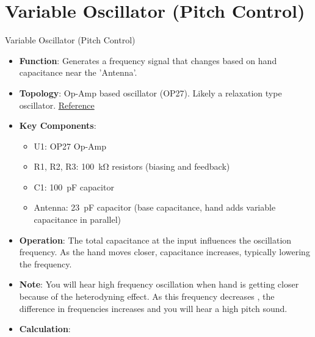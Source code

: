 \documentclass[10pt,xcolor={table,dvipsnames},t]{beamer}
\begin{document}
\section{Variable Oscillator (Pitch Control)}

\begin{frame}{Variable Oscillator (Pitch Control)}
\begin{itemize}
    \item \textbf{Function}: Generates a frequency signal that changes based on hand capacitance near the 'Antenna'.
    \item \textbf{Topology}: Op-Amp based oscillator (OP27). Likely a relaxation type oscillator. \href{https://circuitdigest.com/tutorial/relaxation-oscillator-using-op-amp}{Reference}
      \item \textbf{Key Components}:
    \begin{itemize}
        \item U1: OP27 Op-Amp
        \item R1, R2, R3: \SI{100}{\kilo\ohm} resistors (biasing and feedback)
        \item C1: \SI{100}{\pico\farad} capacitor
        \item Antenna: \SI{23}{\pico\farad} capacitor (base capacitance, hand adds variable capacitance in parallel)
    \end{itemize}
    \item \textbf{Operation}: The total capacitance at the input influences the oscillation frequency. As the hand moves closer, capacitance increases, typically lowering the frequency.  
    \item \textbf{Note}: You will hear high frequency oscillation when hand is getting closer because of the heterodyning effect. As this frequency decreases , the difference in frequencies increases and you will hear a high pitch sound.
    \item \textbf{Calculation}:
\end{itemize}
\end{frame}
\end{document}
